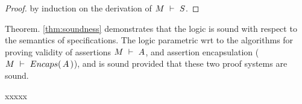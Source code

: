 \begin{proof}
by induction on the derivation of $M\ \vdash\ S$.
\end{proof}

Theorem. \ref{thm:soundness} demonstrates 
 that the   \SpecLang logic is sound with respect to the semantics of \SpecLang specifications.
 The \SpecLang logic parametric wrt to the algorithms for proving validity of assertions
 $M\ \vdash\ A$, and 
 assertion encapsulation ($M\ \vdash\ {Encaps(\, A\, )}$), and is sound
 provided that these two proof systems are sound.


 xxxxx